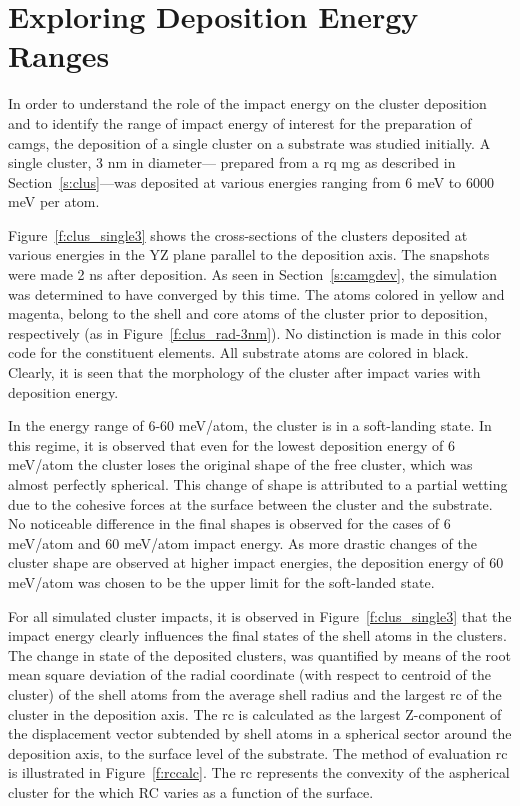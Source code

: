 \section{Exploring Deposition Energy Ranges} \label{c:cibd_single}
\begin{changebar}
In order to understand the role of the impact energy on the cluster deposition and to identify the range of impact energy of interest for the preparation of \gls{camg}s, the deposition of a single cluster on a substrate was studied initially. A single \cz cluster, 3 nm in diameter— prepared from a  \gls{rq} \gls{mg} as described in Section~\ref{s:clus}---was deposited at various energies ranging from 6 meV to 6000 meV per atom. \par

Figure~\ref{f:clus_single3} shows the cross-sections of the clusters deposited at various energies in the YZ plane parallel to the deposition axis. The snapshots were made 2 ns after deposition. As seen in Section~\ref{s:camgdev}, the simulation was determined to have converged by this time. The atoms colored in yellow and magenta, belong to the shell and core atoms of the cluster prior to deposition, respectively (as in Figure~\ref{f:clus_rad-3nm}). No distinction is made in this color code for the constituent elements. All substrate atoms are colored in black. Clearly, it is seen that the morphology of the cluster after impact varies with deposition energy. \par

In the energy range of 6-60 meV/atom, the cluster is in a soft-landing state. In this regime, it is observed that even for the lowest deposition energy of 6 meV/atom the cluster loses the original shape of the free cluster, which was almost perfectly spherical. This change of shape is attributed to a partial wetting due to the cohesive forces at the surface between the cluster and the substrate. No noticeable difference in the final shapes is observed for the cases of 6 meV/atom and 60 meV/atom impact energy. As more drastic changes of the cluster shape are observed at higher impact energies, the deposition energy of 60 meV/atom was chosen to be the upper limit for the soft-landed state. \par
	
For all simulated cluster impacts, it is observed in Figure~\ref{f:clus_single3} that the impact energy clearly influences the final states of the shell atoms in the clusters. The change in state of the deposited clusters, was quantified by means of the root mean square deviation of the radial coordinate (with respect to centroid of the cluster) of the shell atoms from the average shell radius and the largest \gls{rc} of the cluster in the deposition axis. The \gls{rc} is calculated as the largest Z-component of the displacement vector subtended by shell atoms in a spherical sector around the deposition axis, to the surface level of the substrate. The method of evaluation \gls{rc} is illustrated in Figure~\ref{f:rccalc}. The \gls{rc} represents the convexity of the aspherical cluster for the which RC varies as a function of the surface. \par


\end{changebar}
